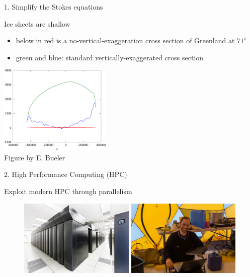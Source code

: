 \documentclass[hide notes,intlimits]{beamer}
\begin{document}
\begin{frame}{1. Simplify the Stokes equations}
  \begin{block}{Ice sheets are shallow}
    \begin{itemize}
    \item below in red is a no-vertical-exaggeration cross section of Greenland at $71^\circ$
      \small
    \item green and blue: standard vertically-exaggerated cross section
    \end{itemize}
    \begin{center}
      \includegraphics[width=0.4\textwidth]{green_transect} \\
      \footnotesize{Figure by E. Bueler}
    \end{center}
  \end{block}
\end{frame}

\begin{frame}{2. High Performance Computing (HPC)}
  \begin{block}{Exploit modern HPC through parallelism}
    \begin{figure}
      \includegraphics[width=5.5cm]{bw_front_sm}
      \hfill
      \includegraphics[width=5.5cm]{jason-parallel}
    \end{figure}
  \end{block}
\end{frame}
\end{document}
